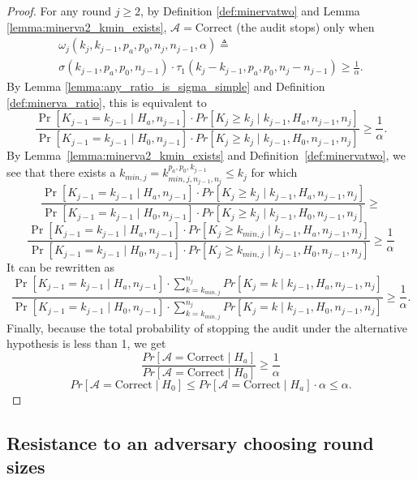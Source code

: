 \begin{proof}
For any round $j\ge 2$, by Definition \ref{def:minervatwo}
and Lemma \ref{lemma:minerva2_kmin_exists},
$\mathcal{A}=\text{Correct}$ (the audit stops) only when
\begin{equation*}
\begin{aligned}
\omega_{j}(k_{j}, k_{j-1}, p_a, p_0, n_{j}, n_{j-1}, \alpha )\triangleq\\
\sigma(k_{j-1},p_a,p_0,n_{j-1})\cdot \tau_1(k_{j}-k_{j-1},p_a,p_0,n_j-n_{j-1})
\ge \frac{1}{\alpha}.
\end{aligned}
\end{equation*}
By Lemma \ref{lemma:any_ratio_is_sigma_simple}
and Definition \ref{def:minerva_ratio}, this is equivalent to
$$
\frac{\Pr[K_{j-1} = {k_{j-1}} \mid H_a, n_{j-1}]\cdot Pr[K_{j} \ge k_{j} \mid {k_{j-1}}, H_a, n_{j-1}, n_{j}]}{\Pr[K_{j-1} = {k_{j-1}} \mid H_0, n_{j-1}]\cdot Pr[K_{j} \ge k_{j} \mid {k_{j-1}}, H_0, n_{j-1}, n_{j}]}\ge \frac{1}{\alpha}.
$$
By Lemma~\ref{lemma:minerva2_kmin_exists} and Definition~\ref{def:minervatwo},
we see that there exists a $k_{min, j} = k_{min, j, n_{j-1}, n_j}^{p_a, p_0, k_{j-1}} \leq k_j$ 
for which
$$
\frac{\Pr[K_{j-1} = {k_{j-1}} \mid H_a, n_{j-1}]\cdot Pr[K_{j} \ge k_{j} \mid {k_{j-1}}, H_a, n_{j-1}, n_{j}]}{\Pr[K_{j-1} = {k_{j-1}} \mid H_0, n_{j-1}]\cdot Pr[K_{j} \ge k_{j} \mid {k_{j-1}}, H_0, n_{j-1}, n_{j}]}\ge
$$
$$
\frac{\Pr[K_{j-1} = {k_{j-1}} \mid H_a, n_{j-1}]\cdot Pr[K_{j} \ge k_{min, j} \mid {k_{j-1}}, H_a, n_{j-1}, n_{j}]}{\Pr[K_{j-1} = {k_{j-1}} \mid H_0, n_{j-1}]\cdot Pr[K_{j} \ge k_{min, j} \mid {k_{j-1}}, H_0, n_{j-1}, n_{j}]} \ge 
\frac{1}{\alpha}
$$
It can be rewritten as
$$
\frac{\Pr[K_{j-1} = {k_{j-1}} \mid H_a, n_{j-1}]\cdot \sum_{{k} = k_{min, j}}^{n_j} Pr[K_{j} = k \mid {k_{j-1}}, H_a, n_{j-1}, n_{j}]}{\Pr[K_{j-1} = {k_{j-1}} \mid H_0, n_{j-1}]\cdot \sum_{{k} = k_{min, j}}^{n_j} Pr[K_{j} = k \mid {k_{j-1}}, H_0, n_{j-1}, n_{j}]}\ge \frac{1}{\alpha}.
$$
Finally, because the total probability of stopping the audit under
the alternative hypothesis is less than 1, we get
$$
\frac{Pr[\mathcal{A}=\text{Correct} \mid H_a]}{Pr[\mathcal{A}=\text{Correct} \mid H_0]}\ge \frac{1}{\alpha}
$$
$$
Pr[\mathcal{A}=\text{Correct} \mid H_0]
\le
Pr[\mathcal{A}=\text{Correct} \mid H_a] \cdot \alpha
\le
\alpha.
$$
\end{proof}

\subsection{Resistance to an adversary choosing round sizes}
\label{sec:adversary}

